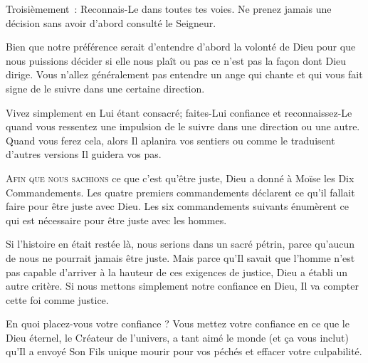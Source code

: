 Troisièmement~: \og Reconnais-Le dans toutes tes voies. \fg{}
 Ne prenez jamais une décision sans avoir d'abord consulté le Seigneur. 


Bien que notre préférence serait d'entendre d'abord la volonté de Dieu
 \ocadr pour que nous puissions décider si elle nous plaît ou pas \fg{}
 ce n'est pas la façon dont Dieu dirige.
 Vous n'allez généralement pas entendre un ange qui chante
 et qui vous fait signe de le suivre dans une certaine direction. 

Vivez simplement en Lui étant consacré; faites-Lui confiance
 et reconnaissez-Le quand vous ressentez une impulsion de le suivre
 dans une direction ou une autre.
 Quand vous ferez cela, alors \og Il aplanira vos sentiers \fg{}
 ou comme le traduisent d'autres versions \og Il guidera vos pas. \fg{}

\dvrule






\lettrine{A}{fin que nous sachions} ce que c'est qu'être juste,
 Dieu a donné à Moïse les Dix Commandements.
 Les quatre premiers commandements déclarent ce qu'il fallait faire
 pour être juste avec Dieu.
 Les six commandements suivants énumèrent ce qui est nécessaire
 pour être juste avec les hommes. 

Si l'histoire en était restée là, nous serions dans un sacré pétrin,
 parce qu'aucun de nous ne pourrait jamais être juste.
 Mais parce qu'Il savait que l'homme n'est pas capable d'arriver
 à la hauteur de ces exigences de justice, Dieu a établi un autre critère.
 Si nous mettons simplement notre confiance en Dieu,
 Il va compter cette foi comme justice. 

En quoi placez-vous votre confiance ?
 Vous mettez votre confiance en ce que le Dieu éternel,
 le Créateur de l'univers, a tant aimé le monde (et ça vous inclut)
 qu'Il a envoyé Son Fils unique mourir pour vos péchés
 et effacer votre culpabilité. 


